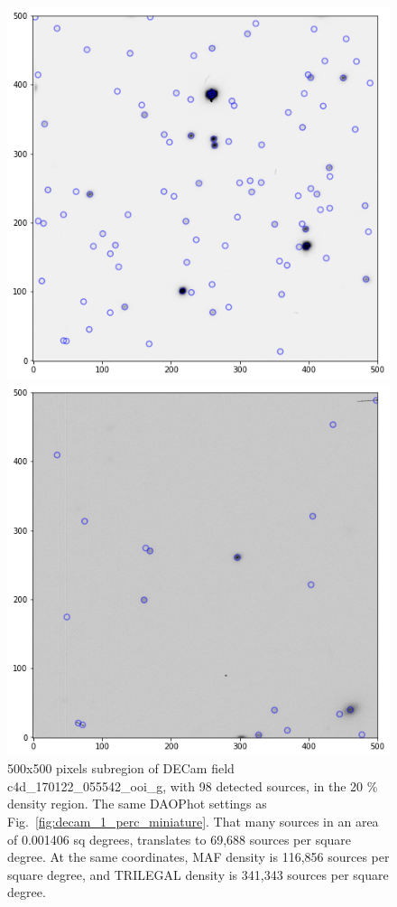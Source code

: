 \documentclass[DM,lsstdraft,toc,usenatbib]{lsstdoc}
\begin{document}

\begin{figure}
\begin{minipage}[t]{0.5\linewidth}
\includegraphics[width=\linewidth]{figs/c4d_170122_055542_ooi_g_v1_1_sub_500px.png}
\caption{500x500 pixels subregion of DECam field c4d\_170122\_055542\_ooi\_g,  with 98  detected sources, in the  20 \% density region. The same DAOPhot settings as Fig.~\ref{fig:decam_1_perc_miniature}. That many sources in an area of 0.001406 sq degrees,  translates to 69,688 sources per square degree. At the same coordinates,  MAF density is  116,856 sources per square degree, and TRILEGAL density is 341,343 sources per square degree. }
\label{fig:decam_20_perc_miniature}
\end{minipage}
\hfill
\begin{minipage}[t]{0.5\linewidth}
\includegraphics[width=\linewidth]{figs/c4d_160607_025052_ooi_g_v1_1_sub_500px.png}

\end{minipage}
\end{figure}
\end{document}
